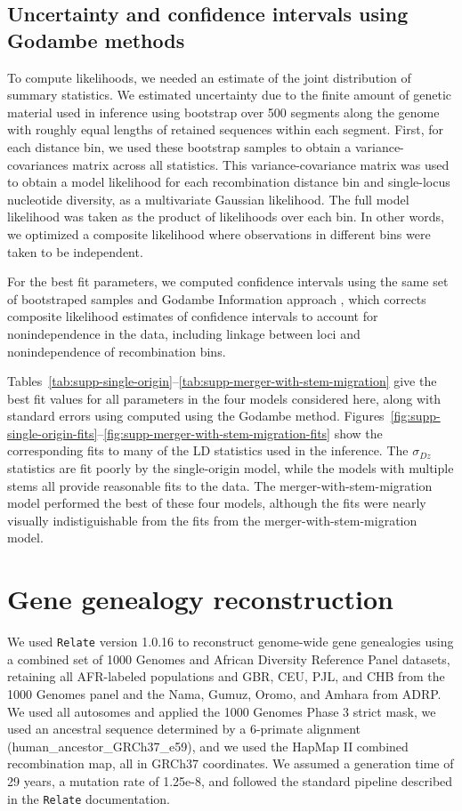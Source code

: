 \documentclass[]{article}
\newcommand{\Relate}{\texttt{Relate}\xspace}
\begin{document}
\subsection{Uncertainty and confidence intervals using Godambe methods}

To compute likelihoods, we needed an estimate of the joint distribution of summary statistics. 
We estimated uncertainty due to the finite amount of genetic material
used in inference using bootstrap over 500 segments along the genome with
roughly equal lengths of retained sequences within each segment. First, for
each distance bin, we used these bootstrap samples to obtain a
variance-covariances matrix across all statistics. This variance-covariance
matrix was used to obtain a model likelihood for each recombination distance
bin and single-locus nucleotide diversity, as a multivariate Gaussian
likelihood. The full model likelihood was taken as the product of likelihoods
over each bin. In other words, we optimized a composite likelihood where
observations in different bins were taken to be independent. 

For the best fit parameters, we computed confidence intervals using the 
same set of bootstraped samples and Godambe Information
approach \citep{Coffman2016-yq}, which corrects composite likelihood estimates of confidence intervals
to account for nonindependence in the data, including linkage between loci and
nonindependence of recombination bins.

Tables~\ref{tab:supp-single-origin}--\ref{tab:supp-merger-with-stem-migration}
give the best fit values for all parameters in the four models considered here,
along with standard errors using computed using the Godambe method.
Figures~\ref{fig:supp-single-origin-fits}--\ref{fig:supp-merger-with-stem-migration-fits}
show the corresponding fits to many of the LD statistics used in the inference.
The $\sigma_{Dz}$ statistics are fit poorly by the single-origin model, while
the models with multiple stems all provide reasonable fits to the data. The
merger-with-stem-migration model performed the best of these four models,
although the fits were nearly visually indistiguishable from the fits from the
merger-with-stem-migration model.

\section{Gene genealogy reconstruction}
\label{sec:relate}

We used \Relate version 1.0.16 \citep{Speidel2019-nj} to reconstruct genome-wide
gene genealogies using a combined set of 1000 Genomes and African Diversity
Reference Panel datasets, retaining all AFR-labeled populations and GBR, CEU,
PJL, and CHB from the 1000 Genomes panel and the Nama, Gumuz, Oromo, and Amhara
from ADRP. We used all autosomes and applied the 1000 Genomes Phase 3 strict
mask, we used an ancestral sequence determined by a 6-primate alignment
(human\_ancestor\_GRCh37\_e59), and we used the HapMap II combined
recombination map, all in GRCh37 coordinates. We assumed a generation time of
29 years, a mutation rate of 1.25e-8, and followed the standard pipeline
described in the \Relate documentation.
\end{document}
